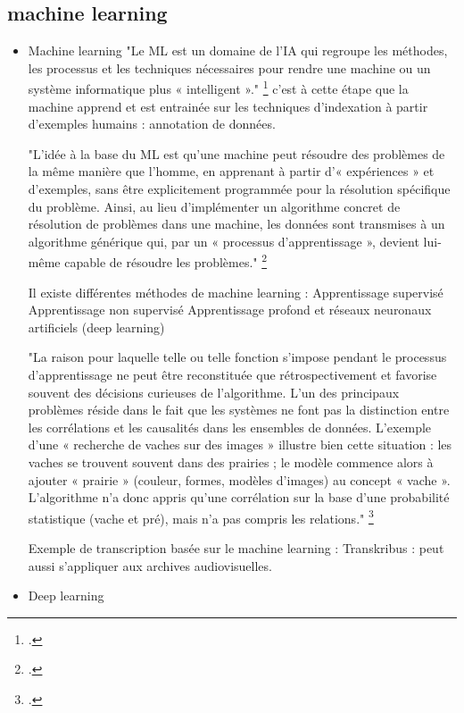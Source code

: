 \subsection{machine learning}

\begin{itemize}

	\item Machine learning 
"Le ML est un domaine de l'IA qui regroupe les méthodes, les processus et les techniques nécessaires pour rendre une machine ou un système informatique plus « intelligent »."
\footcite{zotero-item-584}
c'est à cette étape que la machine apprend et est entrainée sur les techniques d'indexation à partir d'exemples humains : annotation de données. 

"L'idée à la base du ML est qu'une machine peut résoudre des problèmes de la même manière que l'homme, en apprenant à partir d’« expériences » et d'exemples, sans être explicitement programmée pour la résolution spécifique du problème. Ainsi, au lieu d'implémenter un algorithme concret de résolution de problèmes dans une machine, les données sont transmises à un algorithme générique qui, par un « processus d'apprentissage », devient lui-même capable de résoudre les problèmes."
\footcite{zotero-item-584}



Il existe différentes méthodes de machine learning : 
Apprentissage supervisé 
Apprentissage non supervisé 
Apprentissage profond et réseaux neuronaux artificiels (deep learning)


"La raison pour laquelle telle ou telle fonction s'impose
pendant le processus d'apprentissage ne peut être reconstituée que	rétrospectivement et favorise souvent des décisions curieuses de l'algorithme. L'un	des principaux problèmes réside dans le fait que les systèmes ne font pas la	distinction entre les corrélations et les causalités dans les ensembles de données.	L'exemple d'une « recherche de vaches sur des images » illustre bien cette situation	: les vaches se trouvent souvent dans des prairies ; le modèle commence alors à	ajouter « prairie » (couleur, formes, modèles d'images) au concept « vache ». L'algorithme n'a donc appris qu'une corrélation sur la base d'une probabilité statistique (vache et pré), mais n'a pas compris les relations."
\footcite{zotero-item-584}

Exemple de transcription basée sur le machine learning : Transkribus : peut aussi s'appliquer aux archives audiovisuelles.

\item Deep learning 


\end{itemize}

